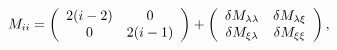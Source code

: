 \begin{equation}
M_{ii}=
\left(
\begin{array}{c c}
2(i-2)&
0\\
0&
2(i-1)\\
\end{array}\right)
+
\left(
\begin{array}{c c}
\delta M_{\lambda\lambda}&
\delta M_{\lambda\xi}\\
\delta M_{\xi\lambda}&
\delta M_{\xi\xi}\\
\end{array}\right),
\end{equation}

